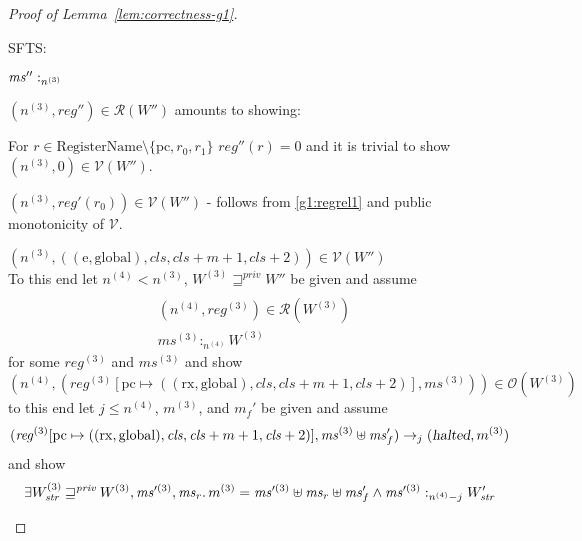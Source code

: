 \documentclass[a4paper]{article}
\newcommand{\update}[2]{[#1 \mapsto #2]}
\newcommand{\var}[1]{\mathit{#1}}
\newcommand{\hs}{\var{ms}}
\newcommand{\ms}{\hs}
\newcommand{\pcreg}{\mathrm{pc}}
\newcommand{\reg}{\var{reg}}
\newcommand{\heap}{\var{mem}}
\newcommand{\halted}{\textsl{halted}}
\newcommand{\futurestr}{\mathbin{\sqsupseteq}^{\var{priv}}}
\newcommand{\heapSat}[3][\heap]{#1 :_{#2} #3}
\newcommand{\memSat}[3][n]{\heapSat[#2]{#1}{#3}}
\newcommand{\asmType}{\plaindom{AsmType}}
\newcommand{\plaindom}[1]{\mathrm{#1}}
\newcommand{\RegName}{\plaindom{RegisterName}}
\newcommand{\intr}[2]{\mathcal{#1}}
\newcommand{\valueintr}[1]{\intr{V}{#1}}
\newcommand{\regintr}[1]{\intr{R}{#1}}
\newcommand{\stdvr}{\valueintr{\asmType}}
\newcommand{\stdrr}{\regintr{\asmType}}
\newcommand{\observations}{\mathcal{O}}
\newcommand{\npair}[2][n]{\left(#1,#2 \right)}
\newcommand{\plainperm}[1]{\mathrm{#1}}
\newcommand{\exec}{\plainperm{rx}}
\newcommand{\entry}{\plainperm{e}}
\newcommand{\glob}{\plainperm{global}}
\newcommand{\step}[1][]{\rightarrow_{#1}}
\begin{document}
\begin{lemma}
\begin{proof}[Proof of Lemma~\ref{lem:correctness-g1}]
\begin{enumproof}
\begin{enumproof}
      SFTS:
      \begin{enumproof}
      \item$\memSat[n^{(3)}]{\ms''}$
      \item $\npair[n^{(3)}]{\reg''} \in \stdrr(W'')$ amounts to showing:
        \begin{enumproof}
        \item For $r \in \RegName \setminus \{\pcreg, r_0, r_1 \}$ $\reg''(r) = 0$ and it is trivial to show $\npair[n^{(3)}]{0} \in \stdvr(W'')$. 
        \item $\npair[n^{(3)}]{\reg'(r_0)} \in \stdvr(W'')$ - follows from \ref{g1:regrel1} and public monotonicity of $\stdvr$.
        \item $\npair[n^{(3)}]{((\entry,\glob),\var{cls},\var{cls} + m + 1,\var{cls}+2)} \in \stdvr(W'')$ \\
          To this end let $n^{(4)} < n^{(3)}$, $W^{(3)} \futurestr W''$ be given and assume
          \begin{align}
            \\ \npair[n^{(4)}]{\reg^{(3)}} \in \stdrr(W^{(3)}) \label{g1:reg-file-cls} &
            \\ \memSat[n^{(4)}]{\ms^{(3)}}{W^{(3)}} \label{g1:memsat-cls}
          \end{align}
          for some $\reg^{(3)}$ and $\ms^{(3)}$ and show
          \[
            \npair[n^{(4)}]{(\reg^{(3)}\update{\pcreg}{((\exec,\glob),\var{cls},\var{cls} + m + 1,\var{cls}+2)},\ms^{(3)})} \in \observations(W^{(3)})
          \]
          to this end let $j \leq n^{(4)}$, $m^{(3)}$, and $m_f'$ be given and assume
          \begin{equation}
            (\reg^{(3)}\update{\pcreg}{((\exec,\glob),\var{cls},\var{cls} + m + 1,\var{cls}+2)},\ms^{(3)} \uplus \ms_f') \step[j] (\halted, m^{(3)}) \label{g1:execution2}
          \end{equation}
          and show
          \begin{equation}
            \exists W_{\var{str}}^{(3)} \futurestr W^{(3)}, \ms'^{(3)}, \ms_r \ldotp m^{(3)} = \ms'^{(3)} \uplus \ms_r \uplus \ms_f' \land \memSat[n^{(4)}-j]{\ms'^{(3)}}{W_{\var{str}}'} \label{g1:g-goal2}

\end{equation}
\end{enumproof}
\end{enumproof}
\end{enumproof}
\end{enumproof}
\end{proof}
\end{lemma}
\end{document}
